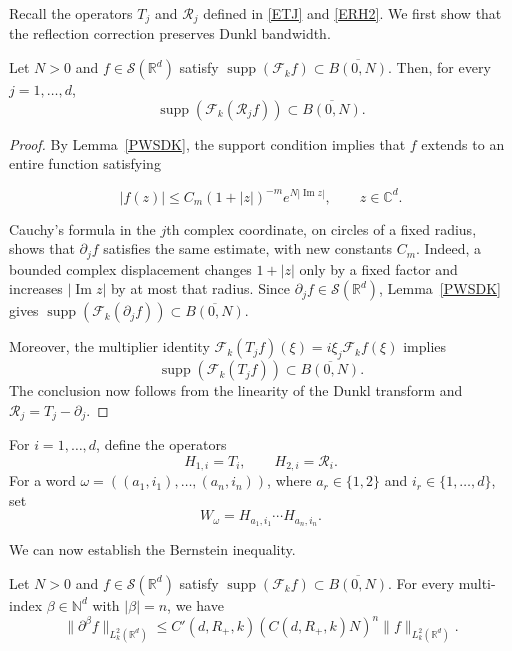 \documentclass[12pt]{article}
\DeclareMathOperator{\supp}{supp}
\begin{document}
Recall the operators $T_j$ and $\mathcal{R}_j$ defined in \eqref{ETJ} and \eqref{ERH2}. We first show that the reflection correction preserves Dunkl bandwidth.

\begin{lemma}\label{LRSS}
Let $N>0$ and $f\in\mathcal{S}(\mathbb{R}^d)$ satisfy $\supp(\mathcal{F}_k f)\subset\overline{B(0,N)}$. Then, for every $j=1,\dots,d$,
\[
\supp(\mathcal{F}_k(\mathcal{R}_j f))\subset\overline{B(0,N)}.
\]
\end{lemma}

\begin{proof}
By Lemma~\ref{PWSDK}, the support condition implies that $f$ extends to an entire function satisfying

\begin{equation}\label{EEE123}
|f(z)|\le C_m(1+|z|)^{-m} e^{N|\operatorname{Im} z|},\qquad z\in\mathbb{C}^d.
\end{equation}

Cauchy's formula in the $j$th complex coordinate, on circles of a fixed radius, shows that $\partial_j f$ satisfies the same estimate, with new constants $C_m$. Indeed, a bounded complex displacement changes $1+|z|$ only by a fixed factor and increases $|\operatorname{Im}z|$ by at most that radius. Since $\partial_j f\in\mathcal{S}(\mathbb{R}^d)$, Lemma~\ref{PWSDK} gives $\supp(\mathcal{F}_k(\partial_j f))\subset\overline{B(0,N)}$.


Moreover, the multiplier identity $\mathcal{F}_k(T_j f)(\xi)=i\xi_j\mathcal{F}_k f(\xi)$ implies
\[
\supp(\mathcal{F}_k (T_jf))\subset \overline{B(0,N)}.
\]
The conclusion now follows from the linearity of the Dunkl transform and $\mathcal{R}_j=T_j-\partial_j$.
\end{proof}

For $i=1,\dots,d$, define the operators
\[
H_{1,i}=T_i,\qquad H_{2,i}=\mathcal{R}_i.
\]
For a word $\omega=((a_1,i_1),\dots,(a_n,i_n))$, where $a_r\in\{1,2\}$ and $i_r\in\{1,\dots,d\}$, set
\[
W_\omega=H_{a_1,i_1}\cdots H_{a_n,i_n}.
\]

We can now establish the Bernstein inequality.
\begin{lemma}\label{LBS2}
Let $N>0$ and $f\in\mathcal{S}(\mathbb{R}^d)$ satisfy $\supp(\mathcal{F}_k f)\subset\overline{B(0,N)}$. For every multi-index $\beta\in\mathbb{N}^d$ with $|\beta|=n$, we have
\begin{equation}\label{EBSS3}
\|\partial^\beta f\|_{L_k^2(\mathbb{R}^d)}\leq C'(d,R_+,k)(C(d,R_+,k)N)^n\|f\|_{L_k^2(\mathbb{R}^d)}.
\end{equation}
\end{lemma}
\end{document}
